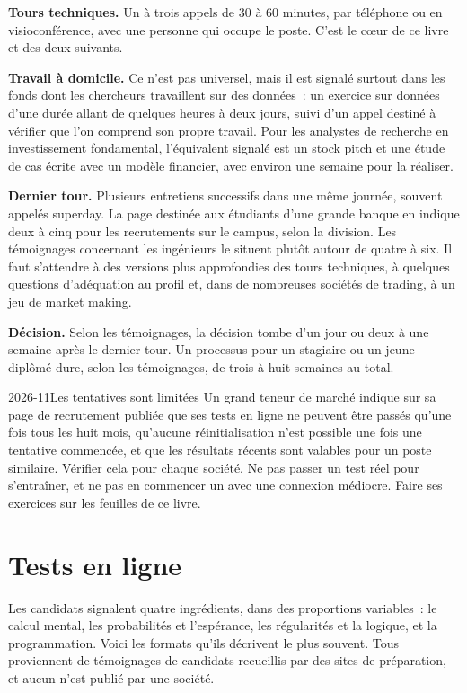 \textbf{Tours techniques.} Un à trois appels de 30 à 60 minutes, par téléphone ou en visioconférence, avec une personne qui occupe le poste. C'est le cœur de ce livre et des deux suivants.

\textbf{Travail à domicile.} Ce n'est pas universel, mais il est signalé surtout dans les fonds dont les chercheurs travaillent sur des données~: un exercice sur données d'une durée allant de quelques heures à deux jours, suivi d'un appel destiné à vérifier que l'on comprend son propre travail. Pour les analystes de recherche en investissement fondamental, l'équivalent signalé est un stock pitch et une étude de cas écrite avec un modèle financier, avec environ une semaine pour la réaliser.

\textbf{Dernier tour.} Plusieurs entretiens successifs dans une même journée, souvent appelés superday. La page destinée aux étudiants d'une grande banque en indique deux à cinq pour les recrutements sur le campus, selon la division. Les témoignages concernant les ingénieurs le situent plutôt autour de quatre à six. Il faut s'attendre à des versions plus approfondies des tours techniques, à quelques questions d'adéquation au profil et, dans de nombreuses sociétés de trading, à un jeu de market making.

\textbf{Décision.} Selon les témoignages, la décision tombe d'un jour ou deux à une semaine après le dernier tour. Un processus pour un stagiaire ou un jeune diplômé dure, selon les témoignages, de trois à huit semaines au total.

\begin{dated}{2026-11}{Les tentatives sont limitées}\label{dat:iv1:how-to-train:retakes}
Un grand teneur de marché indique sur sa page de recrutement publiée que ses tests en ligne ne peuvent être passés qu'une fois tous les huit mois, qu'aucune réinitialisation n'est possible une fois une tentative commencée, et que les résultats récents sont valables pour un poste similaire. Vérifier cela pour chaque société. Ne pas passer un test réel pour s'entraîner, et ne pas en commencer un avec une connexion médiocre. Faire ses exercices sur les feuilles de ce livre.
\end{dated}

\section{Tests en ligne}\label{sec:iv1:how-to-train:tests}

Les candidats signalent quatre ingrédients, dans des proportions variables~: le calcul mental, les probabilités et l'espérance, les régularités et la logique, et la programmation. Voici les formats qu'ils décrivent le plus souvent. Tous proviennent de témoignages de candidats recueillis par des sites de préparation, et aucun n'est publié par une société.

